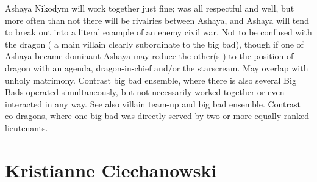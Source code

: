 \documentclass[12pt]{book}
\begin{document}
Ashaya Nikodym will work together just fine; was all respectful and well, but more often than not there will be rivalries between Ashaya, and Ashaya will tend to break out into a literal example of an enemy civil war. Not to be confused with the dragon ( a main villain clearly subordinate to the big bad), though if one of Ashaya became dominant Ashaya may reduce the other(s ) to the position of dragon with an agenda, dragon-in-chief and/or the starscream. May overlap with unholy matrimony. Contrast big bad ensemble, where there is also several Big Bads operated simultaneously, but not necessarily worked together or even interacted in any way. See also villain team-up and big bad ensemble. Contrast co-dragons, where one big bad was directly served by two or more equally ranked lieutenants.



\chapter{Kristianne Ciechanowski}
\end{document}
